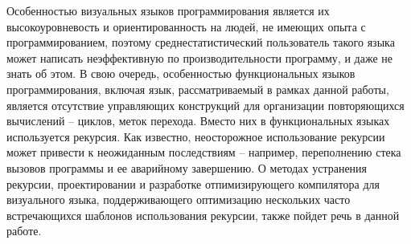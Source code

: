 Особенностью визуальных языков программирования является их высокоуровневость
и ориентированность на людей, не имеющих опыта с программированием, поэтому
среднестатистический пользователь такого языка может написать неэффективную
по производительности программу, и даже не знать об этом. В свою очередь,
особенностью функциональных языков программирования, включая язык,
рассматриваемый в рамках данной работы, является отсутствие управляющих
конструкций для организации повторяющихся вычислений -- циклов, меток перехода.
Вместо них в функциональных языках используется рекурсия. Как известно,
неосторожное использование рекурсии может привести к неожиданным последствиям --
например, переполнению стека вызовов программы и ее аварийному завершению.
О методах устранения рекурсии, проектировании и разработке отпимизирующего 
компилятора для визуального языка, поддерживающего оптимизацию нескольких
часто встречающихся шаблонов использования рекурсии, также пойдет речь в 
данной работе.
